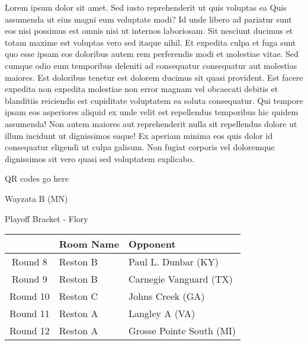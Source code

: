 \documentclass{article}%
\begin{document}
\vspace*{8pt}%
\linebreak%
\newline%
\newline%
Lorem ipsum dolor sit amet. Sed iusto reprehenderit ut quis voluptas ea Quis assumenda ut eius magni eum voluptate modi? Id unde libero ad pariatur sunt eos nisi possimus est omnis nisi ut internos laboriosam. Sit nesciunt ducimus et totam maxime est voluptas vero sed itaque nihil. Et expedita culpa et fuga sunt quo esse ipsam eos doloribus autem rem perferendis modi et molestiae vitae.\newline%
\newline%
Sed cumque odio eum temporibus deleniti ad consequatur consequatur aut molestias maiores. Est doloribus tenetur est dolorem ducimus sit quasi provident. Est facere expedita non expedita molestiae non error magnam vel obcaecati debitis et blanditiis reiciendis est cupiditate voluptatem ea soluta consequatur. Qui tempore ipsam eos asperiores aliquid ex unde velit est repellendus temporibus hic quidem assumenda!\newline%
\newline%
Non autem maiores aut reprehenderit nulla sit repellendus dolore ut illum incidunt ut dignissimos eaque! Ex aperiam minima eos quis dolor id consequatur eligendi ut culpa galisum. Non fugiat corporis vel doloremque dignissimos sit vero quasi sed voluptatem explicabo.\newline%
\newline%
%
\vspace*{30pt}%
\begin{center}%
\begin{Huge}%
QR codes go here%
\end{Huge}%
\end{center}%
\newpage%
\begin{center}%
\begin{Huge}%
Wayzata B (MN)%
\end{Huge}%
\vspace*{8pt}%
\linebreak%
\begin{Large}%
Playoff Bracket {-} Flory%
\end{Large}%
\end{center}%
%
\begin{tabularx}{\textwidth}{|c|Y|Y|}%
\hline%
&Room Name&Opponent\\%
\hline%
Round 8&Reston B&Paul L. Dunbar (KY)\\%
Round 9&Reston B&Carnegie Vanguard (TX)\\%
Round 10&Reston C&Johns Creek (GA)\\%
Round 11&Reston A&Langley A (VA)\\%
Round 12&Reston A&Grosse Pointe South (MI)\\%
\hline%
\end{tabularx}%
\end{document}
